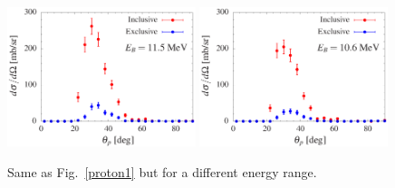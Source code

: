 \documentclass[aps,prc,onecolumn,amsmath,amssymb, preprint, 12pt]{revtex4-1}
\begin{document}
\begin{figure}[!ht]
\includegraphics[width=0.49\textwidth]{ad_230.eps}
\includegraphics[width=0.49\textwidth]{ad_240.eps}\\
 \caption{\label{proton3}  Same as Fig.~\ref{proton1} but for a different energy range. }
 \end{figure}
\end{document}
